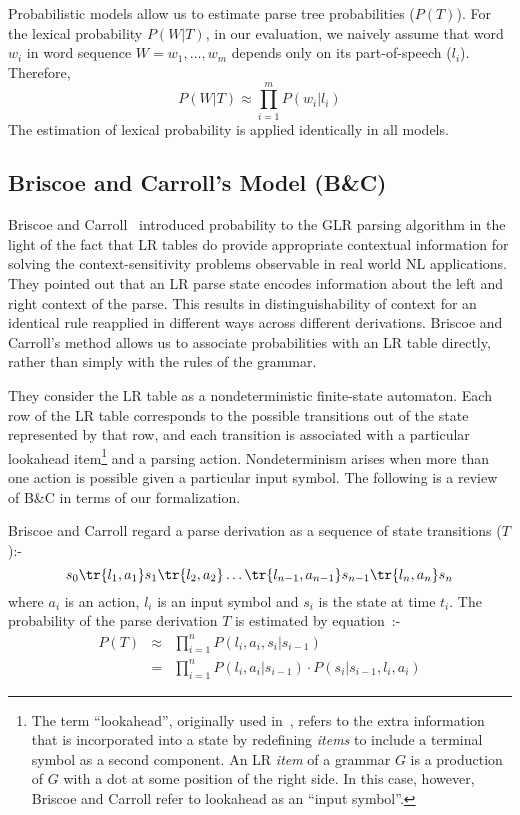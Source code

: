 Probabilistic models allow us to estimate parse tree probabilities
($P(T)$). For the lexical probability $P(W|T)$, in our evaluation, we
naively assume that word $w_i$ in word sequence $W = {w_1,\ldots,w_m}$
depends only on its part-of-speech ($l_i$). Therefore,
\begin{equation}
  \label{eq:lex-prob}
  P(W|T) \approx \prod_{i=1}^m P(w_i|l_i)
\end{equation}
The estimation of lexical probability is applied identically in all
models.

\subsection{Briscoe and Carroll's Model (B\&C)}
Briscoe and Carroll~\cite{Briscoe:93} introduced probability to the
GLR parsing algorithm in the light of the fact that LR tables do
provide appropriate contextual information for solving the
context-sensitivity problems observable in real world NL applications.
They pointed out that an LR parse state encodes information about the
left and right context of the parse. This results in
distinguishability of context for an identical rule reapplied in
different ways across different derivations. Briscoe and Carroll's
method allows us to associate probabilities with an LR table directly,
rather than simply with the rules of the grammar.

They consider the LR table as a nondeterministic finite-state automaton. 
Each row of the LR table corresponds to the possible transitions out of
the state represented by that row, and each transition is associated
with a particular lookahead item\footnote{The term ``lookahead'',
originally used in~\cite{Aho:86}, refers to the extra information that
is incorporated into a state by redefining {\it items} to include a
terminal symbol as a second component. An LR {\it item} of a grammar $G$
is a production of $G$ with a dot at some position of the right side.
In this case, however, Briscoe and Carroll refer to lookahead as an
``input symbol''.} and a parsing action.  Nondeterminism arises when
more than one action is possible given a particular input symbol. The
following is a review of B\&C in terms of our formalization.

Briscoe and Carroll regard a parse derivation as a sequence of state
transitions ($T$):-
\begin{equation}
  \label{eq:b&c-def}
  s_0\tr{l_1,a_1}s_1\tr{l_2,a_2}
  \ldots\tr{l_{n-1},a_{n-1}}s_{n-1}\tr{l_n,a_n}s_n
\end{equation}
where $a_i$ is an action, $l_i$ is an input symbol and $s_i$ is the
state at time $t_i$. The probability of the parse derivation $T$ is
estimated by equation~:-
\begin{eqnarray}
  P(T) &\approx&
  \nonumber{\prod_{i=1}^n P(l_i,a_i,s_i|s_{i-1})} \\
  \label{eq:b&c-bayes}
       &=& \prod_{i=1}^n P(l_i,a_i|s_{i-1}) \cdot P(s_i|s_{i-1},l_i,a_i)
\end{eqnarray}

